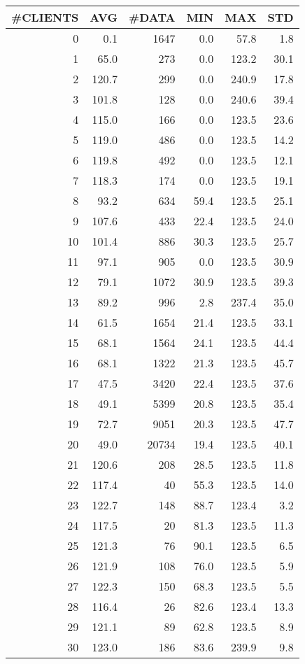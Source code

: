 \begin{tabular}{|r|r|r|r|r|r|}
\hline
 \#CLIENTS & AVG & \#DATA & MIN & MAX & STD\\
\hline
0 &  0.1 & 1647 & 0.0 & 57.8 & 1.8\\
1 &  65.0 & 273 & 0.0 & 123.2 & 30.1\\
2 &  120.7 & 299 & 0.0 & 240.9 & 17.8\\
3 &  101.8 & 128 & 0.0 & 240.6 & 39.4\\
4 &  115.0 & 166 & 0.0 & 123.5 & 23.6\\
5 &  119.0 & 486 & 0.0 & 123.5 & 14.2\\
6 &  119.8 & 492 & 0.0 & 123.5 & 12.1\\
7 &  118.3 & 174 & 0.0 & 123.5 & 19.1\\
8 &  93.2 & 634 & 59.4 & 123.5 & 25.1\\
9 &  107.6 & 433 & 22.4 & 123.5 & 24.0\\
10 &  101.4 & 886 & 30.3 & 123.5 & 25.7\\
11 &  97.1 & 905 & 0.0 & 123.5 & 30.9\\
12 &  79.1 & 1072 & 30.9 & 123.5 & 39.3\\
13 &  89.2 & 996 & 2.8 & 237.4 & 35.0\\
14 &  61.5 & 1654 & 21.4 & 123.5 & 33.1\\
15 &  68.1 & 1564 & 24.1 & 123.5 & 44.4\\
16 &  68.1 & 1322 & 21.3 & 123.5 & 45.7\\
17 &  47.5 & 3420 & 22.4 & 123.5 & 37.6\\
18 &  49.1 & 5399 & 20.8 & 123.5 & 35.4\\
19 &  72.7 & 9051 & 20.3 & 123.5 & 47.7\\
20 &  49.0 & 20734 & 19.4 & 123.5 & 40.1\\
21 &  120.6 & 208 & 28.5 & 123.5 & 11.8\\
22 &  117.4 & 40 & 55.3 & 123.5 & 14.0\\
23 &  122.7 & 148 & 88.7 & 123.4 & 3.2\\
24 &  117.5 & 20 & 81.3 & 123.5 & 11.3\\
25 &  121.3 & 76 & 90.1 & 123.5 & 6.5\\
26 &  121.9 & 108 & 76.0 & 123.5 & 5.9\\
27 &  122.3 & 150 & 68.3 & 123.5 & 5.5\\
28 &  116.4 & 26 & 82.6 & 123.4 & 13.3\\
29 &  121.1 & 89 & 62.8 & 123.5 & 8.9\\
30 &  123.0 & 186 & 83.6 & 239.9 & 9.8\\

\end{tabular}
